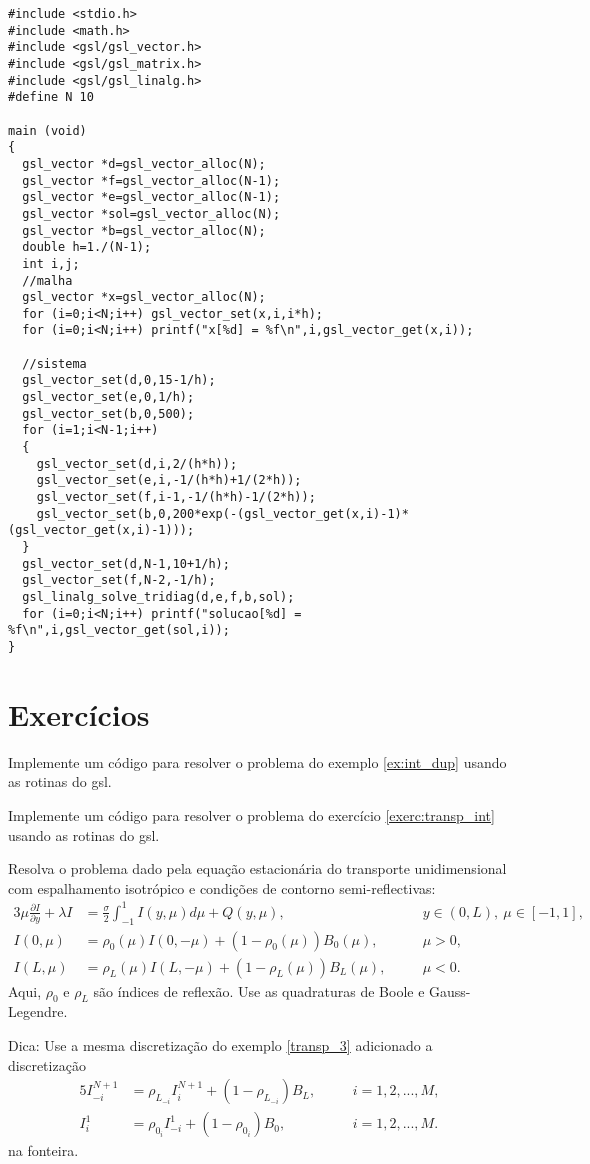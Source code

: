 \begin{verbatim}
#include <stdio.h>
#include <math.h>
#include <gsl/gsl_vector.h>
#include <gsl/gsl_matrix.h>
#include <gsl/gsl_linalg.h>
#define N 10

main (void)
{
  gsl_vector *d=gsl_vector_alloc(N);
  gsl_vector *f=gsl_vector_alloc(N-1);
  gsl_vector *e=gsl_vector_alloc(N-1);
  gsl_vector *sol=gsl_vector_alloc(N);
  gsl_vector *b=gsl_vector_alloc(N);
  double h=1./(N-1);
  int i,j;
  //malha
  gsl_vector *x=gsl_vector_alloc(N);
  for (i=0;i<N;i++) gsl_vector_set(x,i,i*h);
  for (i=0;i<N;i++) printf("x[%d] = %f\n",i,gsl_vector_get(x,i));

  //sistema
  gsl_vector_set(d,0,15-1/h);
  gsl_vector_set(e,0,1/h);
  gsl_vector_set(b,0,500);
  for (i=1;i<N-1;i++)
  {
    gsl_vector_set(d,i,2/(h*h));
    gsl_vector_set(e,i,-1/(h*h)+1/(2*h));
    gsl_vector_set(f,i-1,-1/(h*h)-1/(2*h));
    gsl_vector_set(b,0,200*exp(-(gsl_vector_get(x,i)-1)*(gsl_vector_get(x,i)-1)));
  }
  gsl_vector_set(d,N-1,10+1/h);
  gsl_vector_set(f,N-2,-1/h);
  gsl_linalg_solve_tridiag(d,e,f,b,sol);
  for (i=0;i<N;i++) printf("solucao[%d] = %f\n",i,gsl_vector_get(sol,i));
}
\end{verbatim}

\section{Exercícios}
\begin{exer}
 Implemente um código para resolver o problema do exemplo \ref{ex:int_dup} usando as rotinas do gsl.
\end{exer}
\begin{exer}
 Implemente um código para resolver o problema do exercício \ref{exerc:transp_int} usando as rotinas do gsl.
\end{exer}


\begin{exer}
Resolva o problema dado pela equação estacionária do transporte unidimensional com espalhamento isotrópico e condições de contorno semi-reflectivas:
\begin{alignat*}{3}
\mu\frac{\partial I}{\partial y}+\lambda I&=\frac{\sigma}{2}\int_{-1}^1 I(y,\mu)d\mu+Q(y,\mu), & &y\in (0,L),\ \mu\in[-1,1],\\
I(0,\mu)&=\rho_0(\mu)I(0,-\mu)+ (1-\rho_0(\mu))B_0(\mu), & &\mu>0,\\
I(L,\mu)&=\rho_L(\mu)I(L,-\mu)+ (1-\rho_L(\mu))B_L(\mu), &\quad &\mu<0.
\end{alignat*}
Aqui, $\rho_0$ e $\rho_L$ são índices de reflexão. Use as quadraturas de Boole e Gauss-Legendre.

Dica: Use a mesma discretização do exemplo \ref{transp_3} adicionado a discretização
\begin{alignat*}{5}
I_{-i}^{N+1}&=\rho_{L_{-i}} I_{i}^{N+1}+(1-\rho_{L_{-i}}) B_L, &\quad &i=1,2,...,M,\\
I_i^1&=\rho_{0{_i}}I_{-i}^1+(1-\rho_{0{_i}}) B_0, & &i=1,2,...,M.
\end{alignat*}
na fonteira.

\end{exer}


